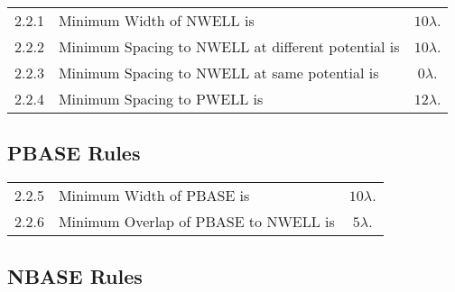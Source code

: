 \documentclass[10pt,a4paper,oneside]{article}
\newcounter{ct}
\begin{document}
\begin{flushleft}
    \begin{tabular}{c l c}
        2.2.1  & Minimum Width of NWELL is & $ 10 \lambda $. \\
        2.2.2  & Minimum Spacing to NWELL at different potential is & $ 10 \lambda $. \\
        2.2.3  & Minimum Spacing to NWELL at same potential is & $ 0 \lambda $. \\
        2.2.4  & Minimum Spacing to PWELL is & $ 12 \lambda $. \\
    \end{tabular}
\end{flushleft}

\subsection{PBASE Rules}\label{design_rules_pbase_rules}

\begin{center}
\end{center}

\begin{flushleft}
    \begin{tabular}{c l c}
        2.2.5  & Minimum Width of PBASE is & $ 10 \lambda $. \\
        2.2.6  & Minimum Overlap of PBASE to NWELL is & $ 5 \lambda $. \\
    \end{tabular}
\end{flushleft}

\subsection{NBASE Rules}\label{design_rules_nbase_rules}
\end{document}
